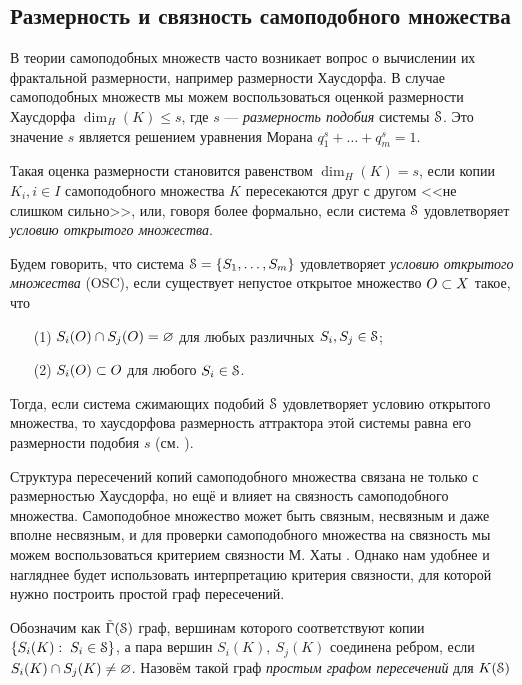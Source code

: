 \subsection{Размерность и связность самоподобного множества}

В теории самоподобных множеств часто возникает вопрос о вычислении их фрактальной размерности, например размерности Хаусдорфа.
В случае самоподобных множеств мы можем воспользоваться оценкой размерности Хаусдорфа $\dim_H(K)\leq s$, где $s$ --- {\em размерность подобия} системы ${\EuScript S}$.
Это значение $s$ является решением уравнения Морана $q_1^s+\ldots+q_m^s=1$.

Такая оценка размерности становится равенством $\dim_H(K)=s$, если копии ${K_i, i\in I}$ самоподобного множества $K$ пересекаются друг с другом <<не слишком сильно>>, или, говоря более формально, если система ${\EuScript S}$ удовлетворяет {\em условию открытого множества}. 

\begin{definition}\label{dfn:osc}
Будем говорить, что система ${\EuScript S}=\{S_1,\ldots,S_m\}$ удовлетворяет {\em условию открытого множества} (OSC), если существует непустое открытое множество $O \subset X$ такое, что
\begin{enumerate}[nolistsep]
\item[(1)] $S_i(O)\cap S_j(O)=\varnothing$ для любых различных $S_i,S_j\in{\EuScript S}$;
\item[(2)] $S_i(O)\subset O$ для любого $S_i\in{\EuScript S}$.
\end{enumerate}
\end{definition}

Тогда, если система сжимающих подобий ${\EuScript S}$ удовлетворяет условию открытого множества, то хаусдорфова размерность аттрактора этой системы равна его размерности подобия $s$ (см. \cite{Hut1981, Falconer2004}).

Структура пересечений копий самоподобного множества связана не только с размерностью Хаусдорфа, но ещё и влияет на связность самоподобного множества.
Самоподобное множество может быть связным, несвязным и даже вполне несвязным, и для проверки самоподобного множества на связность мы можем воспользоваться критерием связности М. Хаты \cite[Theorem 4.6]{Hata1985}.
Однако нам удобнее и нагляднее будет использовать интерпретацию критерия связности, для которой нужно построить простой граф пересечений.

\begin{definition}
Обозначим как $\tilde{\Gamma}({\EuScript S})$ граф, вершинам которого соответствуют копии $\{S_i(K):\; S_i\in {\EuScript S}\}$, а пара вершин $S_i(K),\ S_j(K)$ соединена ребром, если $S_i(K)\cap S_j(K)\neq\varnothing$.
Назовём такой граф {\em простым графом пересечений} для $K({\EuScript S})$ 
\end{definition}

